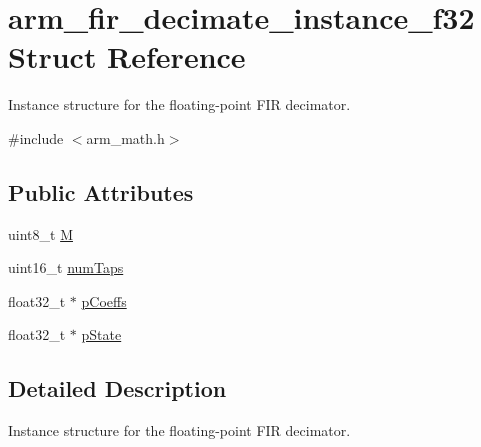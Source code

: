 \hypertarget{structarm__fir__decimate__instance__f32}{\section{arm\-\_\-fir\-\_\-decimate\-\_\-instance\-\_\-f32 Struct Reference}
\label{structarm__fir__decimate__instance__f32}
}


Instance structure for the floating-\/point F\-I\-R decimator.  




{\ttfamily \#include $<$arm\-\_\-math.\-h$>$}

\subsection*{Public Attributes}
\begin{DoxyCompactItemize}
\item 
uint8\-\_\-t \hyperlink{structarm__fir__decimate__instance__f32_a76a8b2161731638eb3d67f277919f95d}{M}
\item 
uint16\-\_\-t \hyperlink{structarm__fir__decimate__instance__f32_a2aa2986129db8affef03ede88dd45a03}{num\-Taps}
\item 
float32\-\_\-t $\ast$ \hyperlink{structarm__fir__decimate__instance__f32_a268a8b0e80a3d9764baf33e4bc10dde2}{p\-Coeffs}
\item 
float32\-\_\-t $\ast$ \hyperlink{structarm__fir__decimate__instance__f32_a5bddf29aaaf2011d2e3bcec59a83f633}{p\-State}
\end{DoxyCompactItemize}


\subsection{Detailed Description}
Instance structure for the floating-\/point F\-I\-R decimator. 

